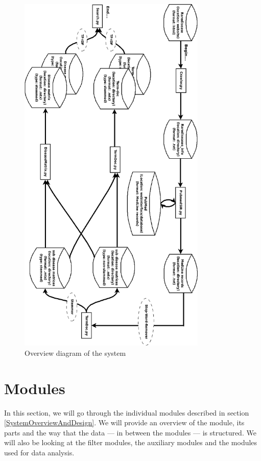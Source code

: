 \begin{figure}[H]
        \begin{center}
          \includegraphics[width=0.8\textwidth]{diagrammer/system_overview_rotate.png}
        \end{center}
        \caption{Overview diagram of the system}
        \label{OverviewDiagram}
\end{figure}

\section{Modules}

In this section, we will go through the individual modules described
in section \ref{SystemOverviewAndDesign}. We will provide an
overview of the module, its parts and the way that the data --- in
between the modules --- is structured. We will also be looking at the
filter modules, the auxiliary modules and the modules used for data
analysis.

